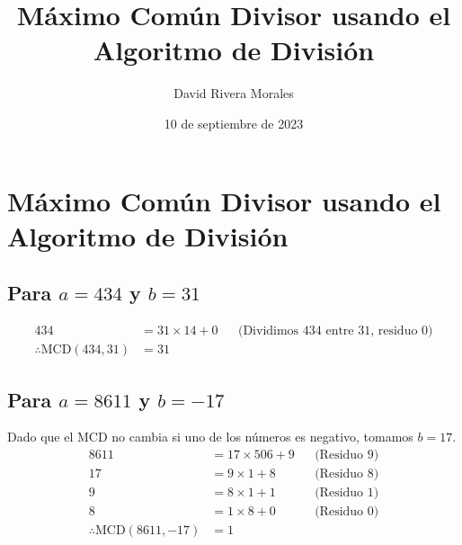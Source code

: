 \documentclass{article}
\author{David Rivera Morales}
\title{Máximo Común Divisor usando el Algoritmo de División}
\date{10 de septiembre de 2023}
\begin{document}
\maketitle

\section*{Máximo Común Divisor usando el Algoritmo de División}

\subsection*{Para \(a = 434\) y \(b = 31\)}
\begin{align*}
434 & = 31 \times 14 + 0 &&\text{(Dividimos 434 entre 31, residuo 0)} \\
\therefore \text{MCD}(434,31) & = 31 
\end{align*}

\subsection*{Para \(a = 8611\) y \(b = -17\)}
Dado que el MCD no cambia si uno de los números es negativo, tomamos \(b = 17\).
\begin{align*}
8611 & = 17 \times 506 + 9 &&\text{(Residuo 9)} \\
17 & = 9 \times 1 + 8 &&\text{(Residuo 8)} \\
9 & = 8 \times 1 + 1 &&\text{(Residuo 1)} \\
8 & = 1 \times 8 + 0 &&\text{(Residuo 0)} \\
\therefore \text{MCD}(8611,-17) & = 1 
\end{align*}
\end{document}
